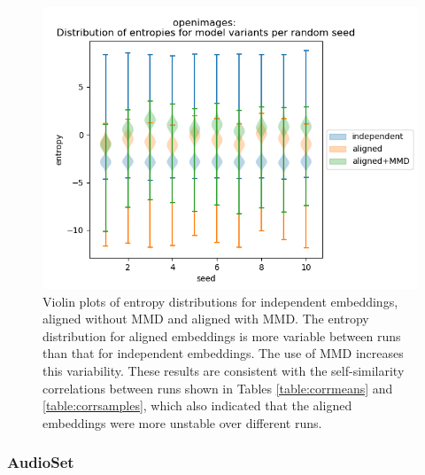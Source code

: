 \begin{figure}[H]
\label{fig:entropyviolinimgs}
\centering
\includegraphics[width=\textwidth]{images/results/openimages_entropies_violin.png}
\caption{Violin plots of entropy distributions for independent embeddings, aligned without MMD and aligned with MMD. The entropy distribution for aligned embeddings is more variable between runs than that for independent embeddings. The use of MMD increases this variability. These results are consistent with the self-similarity correlations between runs shown in Tables \ref{table:corrmeans} and \ref{table:corrsamples}, which also indicated that the aligned embeddings were more unstable over different runs.}
\end{figure}

\subsubsection{AudioSet}

